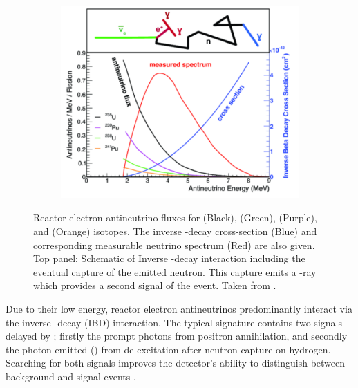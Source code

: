 \begin{figure}[h]
  \begin{subfigure}[t]{0.90\textwidth}
    \includegraphics[width=\textwidth, trim={0mm 0mm 0mm 0mm}, clip,page=1]{Figures/Theory/ReactorNeutrinoProduction.pdf}
  \end{subfigure}
  \caption{Reactor electron antineutrino fluxes for  (Black),  (Green),  (Purple), and  (Orange) isotopes. The inverse \quickmath{\beta}-decay cross-section (Blue) and corresponding measurable neutrino spectrum (Red) are also given. Top panel: Schematic of Inverse \quickmath{\beta}-decay interaction including the eventual capture of the emitted neutron. This capture emits a \quickmath{\gamma}-ray which provides a second signal of the event. Taken from \cite{Athar_2022}.}
  \label{fig:NeutrinoOscillationPhysics_ReactorNeutrinoProduction}
\end{figure}

Due to their low energy, reactor electron antineutrinos predominantly interact via the inverse \quickmath{\beta}-decay (IBD) interaction. The typical signature contains two signals delayed by ; firstly the prompt photons from positron annihilation, and secondly the photon emitted () from de-excitation after neutron capture on hydrogen. Searching for both signals improves the detector's ability to distinguish between background and signal events \cite{Abe2022-ij}. %

